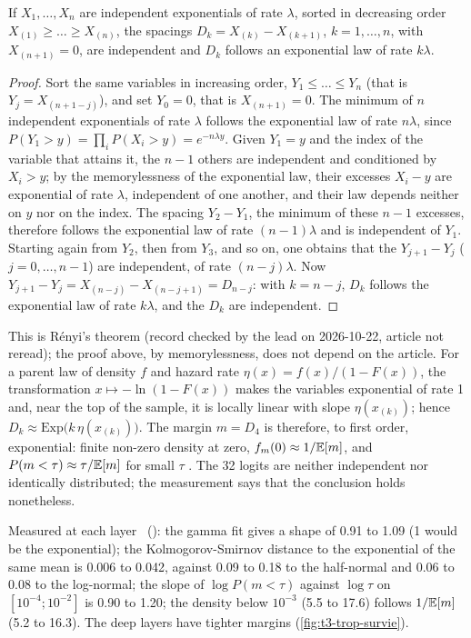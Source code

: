 \begin{lemme}\label{t3tro:lem:renyi}
If $X_1, \dots, X_n$ are independent exponentials of rate $\lambda$, sorted in decreasing order $X_{(1)} \ge \dots \ge X_{(n)}$, the spacings $D_k = X_{(k)} - X_{(k+1)}$, $k = 1, \dots, n$, with $X_{(n+1)} = 0$, are independent and $D_k$ follows an exponential law of rate $k\lambda$.
\end{lemme}
\begin{proof}
Sort the same variables in increasing order, $Y_1 \le \dots \le Y_n$ (that is $Y_j = X_{(n+1-j)}$), and set $Y_0 = 0$, that is $X_{(n+1)} = 0$. The minimum of $n$ independent exponentials of rate $\lambda$ follows the exponential law of rate $n\lambda$, since $P(Y_1 > y) = \prod_i P(X_i > y) = e^{-n\lambda y}$. Given $Y_1 = y$ and the index of the variable that attains it, the $n - 1$ others are independent and conditioned by $X_i > y$; by the memorylessness of the exponential law, their excesses $X_i - y$ are exponential of rate $\lambda$, independent of one another, and their law depends neither on $y$ nor on the index. The spacing $Y_2 - Y_1$, the minimum of these $n - 1$ excesses, therefore follows the exponential law of rate $(n-1)\lambda$ and is independent of $Y_1$. Starting again from $Y_2$, then from $Y_3$, and so on, one obtains that the $Y_{j+1} - Y_j$ ($j = 0, \dots, n-1$) are independent, of rate $(n - j)\lambda$. Now $Y_{j+1} - Y_j = X_{(n-j)} - X_{(n-j+1)} = D_{n-j}$: with $k = n - j$, $D_k$ follows the exponential law of rate $k\lambda$, and the $D_k$ are independent.
\end{proof}
This is Rényi's theorem \cite{renyi1953ordre} (record checked by the lead on 2026-10-22, article not reread); the proof above, by memorylessness, does not depend on the article. For a parent law of density $f$ and hazard rate $\eta(x) = f(x)/(1 - F(x))$, the transformation $x \mapsto -\ln(1 - F(x))$ makes the variables exponential of rate 1 and, near the top of the sample, it is locally linear with slope $\eta(x_{(k)})$; hence $D_k \approx \mathrm{Exp}\bigl(k\,\eta(x_{(k)})\bigr)$. The margin $m = D_4$ is therefore, to first order, exponential: finite non-zero density at zero, $f_m(0) \approx 1/\mathbb{E}[m]$, and $P(m < \tau) \approx \tau/\mathbb{E}[m]$ for small $\tau$ \calc. The 32 logits are neither independent nor identically distributed; the measurement says that the conclusion holds nonetheless.

Measured at each layer \mes~(): the gamma fit gives a shape of 0.91 to 1.09 (1 would be the exponential); the Kolmogorov-Smirnov distance to the exponential of the same mean is 0.006 to 0.042, against 0.09 to 0.18 to the half-normal and 0.06 to 0.08 to the log-normal; the slope of $\log P(m < \tau)$ against $\log\tau$ on $[10^{-4}; 10^{-2}]$ is 0.90 to 1.20; the density below $10^{-3}$ (5.5 to 17.6) follows $1/\mathbb{E}[m]$ (5.2 to 16.3). The deep layers have tighter margins (\cref{fig:t3-trop-survie}).

